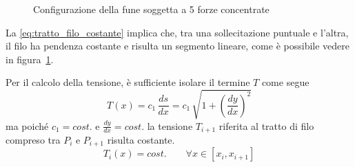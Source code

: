 \begin{figure}
  \centering
  

\caption{Configurazione della fune soggetta a 5 forze concentrate}
\label{fig:fune_forze_concentrate}
   
\end{figure}

La \eqref{eq:tratto_filo_costante} implica che, tra una sollecitazione puntuale e l'altra, il filo ha pendenza costante e risulta un segmento lineare, come è possibile vedere in figura~\ref{fig:fune_forze_concentrate}.

Per il calcolo della tensione, è sufficiente isolare il termine $T$ come segue
\[
T(x) = c_1\,\dfrac{ds}{dx} = c_1\,\sqrt{1+\left(\dfrac{dy}{dx}\right)^2}
\]
ma poiché $c_1 = cost.$ e $\frac{dy}{dx} = cost.$ la tensione $T_{i+1}$ riferita al tratto di filo compreso tra $P_i$ e $P_{i+1}$ risulta costante.
\begin{equation}
\label{eq:tensione_costante}
T_i(x) = cost.\qquad \forall x \in [x_i, x_{i+1}]
\end{equation}

